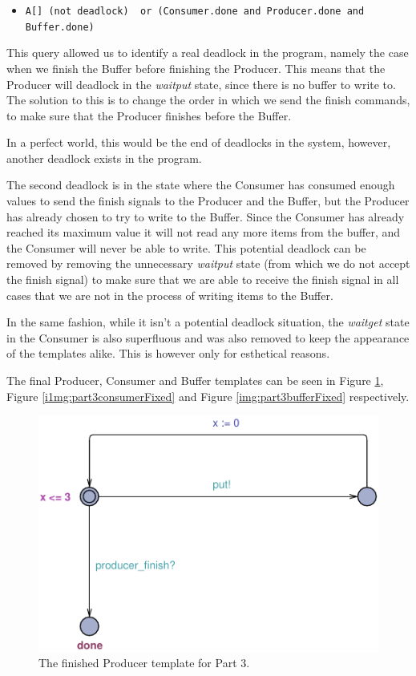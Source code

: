 \documentclass[a4paper,10pt]{article}
\newcommand{\query}[1]{\lstinline{#1}}
\begin{document}
\begin{itemize}
  \item[] \query{A[] (not deadlock)  or (Consumer.done and Producer.done and Buffer.done)}
\end{itemize}

This query allowed us to identify a real deadlock in the program, namely the case when we finish the Buffer before finishing the Producer. This means that the Producer will deadlock in the \emph{waitput} state, since there is no buffer to write to. The solution to this is to change the order in which we send the finish commands, to make sure that the Producer finishes before the Buffer.

In a perfect world, this would be the end of deadlocks in the system, however, another deadlock exists in the program.

The second deadlock is in the state where the Consumer has consumed enough values to send the finish signals to the Producer and the Buffer, but the Producer has already chosen to try to write to the Buffer. Since the Consumer has already reached its maximum value it will not read any more items from the buffer, and the Consumer will never be able to write. This potential deadlock can be removed by removing the unnecessary \emph{waitput} state (from which we do not accept the finish signal) to make sure that we are able to receive the finish signal in all cases that we are not in the process of writing items to the Buffer.

In the same fashion, while it isn't a potential deadlock situation, the \emph{waitget} state in the Consumer is also superfluous and was also removed to keep the appearance of the templates alike. This is however only for esthetical reasons.

The final Producer, Consumer and Buffer templates can be seen in Figure \ref{img:part3producerFixed}, Figure \ref{i1mg:part3consumerFixed} and Figure \ref{img:part3bufferFixed} respectively.

\begin{figure}[h]
  \center
  \includegraphics{Part3ProducerFixed.pdf}
  \caption{The finished Producer template for Part 3.}
  \label{img:part3producerFixed}
\end{figure}
\end{document}
